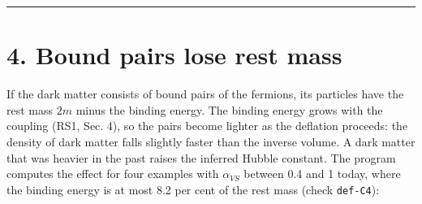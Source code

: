 \documentclass[
  10pt,
]{article}
\begin{document}
\begin{center}\rule{0.5\linewidth}{0.5pt}\end{center}

\hypertarget{bound-pairs-lose-rest-mass}{%
\section{4. Bound pairs lose rest
mass}\label{bound-pairs-lose-rest-mass}}

If the dark matter consists of bound pairs of the fermions, its
particles have the rest mass \(2m\) minus the binding energy. The
binding energy grows with the coupling (RS1, Sec. 4), so the pairs
become lighter as the deflation proceeds: the density of dark matter
falls slightly faster than the inverse volume. A dark matter that was
heavier in the past raises the inferred Hubble constant. The program
computes the effect for four examples with \(\alpha_{VS}\) between 0.4
and 1 today, where the binding energy is at most 8.2 per cent of the
rest mass (check \texttt{def-C4}):
\end{document}

